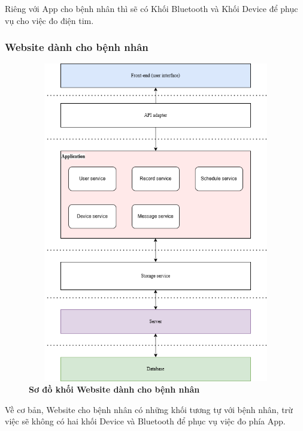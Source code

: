 Riêng với App cho bệnh nhân thì sẽ có Khối Bluetooth và Khối Device để phục vụ
cho việc đo điện tim.


\subsubsection{Website dành cho bệnh nhân}
\begin{figure}[H]
  \centering
  \includegraphics[width=12cm,height=14cm]{Images/System/fmECG_architecture-Patient.drawio.png}
  \caption[Sơ đồ khối Website dành cho bệnh nhân]{\bfseries \fontsize{12pt}{0pt}\selectfont Sơ đồ khối Website dành cho bệnh nhân}
  \label{fmECG_architecture-Patient} %
\end{figure}
Về cơ bản, Website cho bệnh nhân có những khối tương tự với bệnh nhân, trừ
việc sẽ không có hai khối Device và Bluetooth để phục vụ việc đo phía App.

